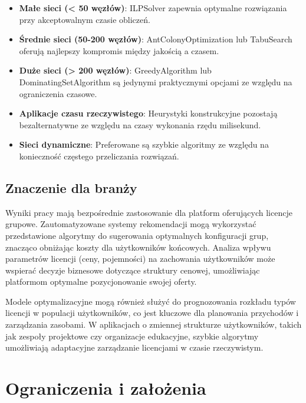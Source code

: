 \begin{itemize}
  \item \textbf{Małe sieci (< 50 węzłów)}: ILPSolver zapewnia optymalne rozwiązania przy akceptowalnym czasie obliczeń.

  \item \textbf{Średnie sieci (50-200 węzłów)}: AntColonyOptimization lub TabuSearch oferują najlepszy kompromis między jakością a czasem.

  \item \textbf{Duże sieci (> 200 węzłów)}: GreedyAlgorithm lub DominatingSetAlgorithm są jedynymi praktycznymi opcjami ze względu na ograniczenia czasowe.

  \item \textbf{Aplikacje czasu rzeczywistego}: Heurystyki konstrukcyjne pozostają bezalternatywne ze względu na czasy wykonania rzędu milisekund.

  \item \textbf{Sieci dynamiczne}: Preferowane są szybkie algoritmy ze względu na konieczność częstego przeliczania rozwiązań.
\end{itemize}

\subsection{Znaczenie dla branży}

Wyniki pracy mają bezpośrednie zastosowanie dla platform oferujących licencje grupowe. Zautomatyzowane systemy rekomendacji mogą wykorzystać przedstawione algorytmy do sugerowania optymalnych konfiguracji grup, znacząco obniżając koszty dla użytkowników końcowych. Analiza wpływu parametrów licencji (ceny, pojemności) na zachowania użytkowników może wspierać decyzje biznesowe dotyczące struktury cenowej, umożliwiając platformom optymalne pozycjonowanie swojej oferty.

Modele optymalizacyjne mogą również służyć do prognozowania rozkładu typów licencji w populacji użytkowników, co jest kluczowe dla planowania przychodów i zarządzania zasobami. W aplikacjach o zmiennej strukturze użytkowników, takich jak zespoły projektowe czy organizacje edukacyjne, szybkie algorytmy umożliwiają adaptacyjne zarządzanie licencjami w czasie rzeczywistym.

\section{Ograniczenia i założenia}

